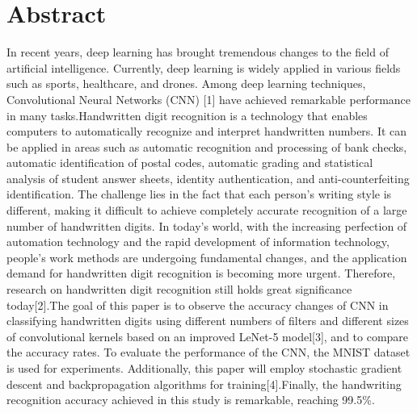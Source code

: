 \documentclass[11pt]{article}
\begin{document}
\section*{Abstract}
\label{sec:org3dd3638}
In recent years, deep learning has brought tremendous changes to the field of artificial intelligence. Currently, deep learning is widely applied in various fields such as sports, healthcare, and drones. Among deep learning techniques, Convolutional Neural Networks (CNN) [1] have achieved remarkable performance in many tasks.Handwritten digit recognition is a technology that enables computers to automatically recognize and interpret handwritten numbers. It can be applied in areas such as automatic recognition and processing of bank checks, automatic identification of postal codes, automatic grading and statistical analysis of student answer sheets, identity authentication, and anti-counterfeiting identification. The challenge lies in the fact that each person's writing style is different, making it difficult to achieve completely accurate recognition of a large number of handwritten digits. In today's world, with the increasing perfection of automation technology and the rapid development of information technology, people's work methods are undergoing fundamental changes, and the application demand for handwritten digit recognition is becoming more urgent. Therefore, research on handwritten digit recognition still holds great significance today[2].The goal of this paper is to observe the accuracy changes of CNN in classifying handwritten digits using different numbers of filters and different sizes of convolutional kernels based on an improved LeNet-5 model[3], and to compare the accuracy rates. To evaluate the performance of the CNN, the MNIST dataset is used for experiments. Additionally, this paper will employ stochastic gradient descent and backpropagation algorithms for training[4].Finally, the handwriting recognition accuracy achieved in this study is remarkable, reaching 99.5\%.
\end{document}

